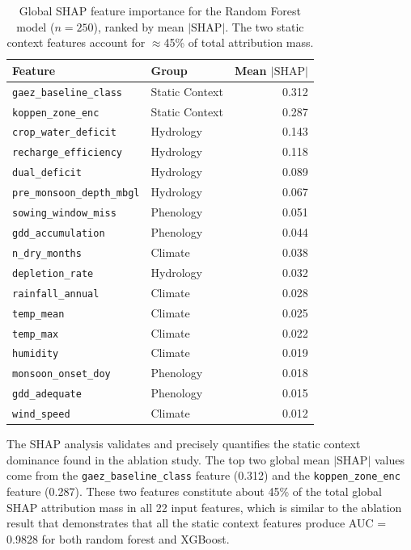 \documentclass{ieeeaccess}
\begin{document}
\begin{table}[t]
\centering
\caption{Global SHAP feature importance for the Random Forest model ($n=250$), ranked by mean $|\text{SHAP}|$. The two static context features account for $\approx$45\% of total attribution mass.}
\label{fig:shap_importance}
\begin{tabular}{llr}
\hline
\textbf{Feature} & \textbf{Group} & \textbf{Mean $|\text{SHAP}|$} \\
\hline
\texttt{gaez\_baseline\_class}      & Static Context & 0.312 \\
\texttt{koppen\_zone\_enc}          & Static Context & 0.287 \\
\texttt{crop\_water\_deficit}       & Hydrology      & 0.143 \\
\texttt{recharge\_efficiency}       & Hydrology      & 0.118 \\
\texttt{dual\_deficit}              & Hydrology      & 0.089 \\
\texttt{pre\_monsoon\_depth\_mbgl}  & Hydrology      & 0.067 \\
\texttt{sowing\_window\_miss}       & Phenology      & 0.051 \\
\texttt{gdd\_accumulation}          & Phenology      & 0.044 \\
\texttt{n\_dry\_months}             & Climate        & 0.038 \\
\texttt{depletion\_rate}            & Hydrology      & 0.032 \\
\texttt{rainfall\_annual}           & Climate        & 0.028 \\
\texttt{temp\_mean}                 & Climate        & 0.025 \\
\texttt{temp\_max}                  & Climate        & 0.022 \\
\texttt{humidity}                   & Climate        & 0.019 \\
\texttt{monsoon\_onset\_doy}        & Phenology      & 0.018 \\
\texttt{gdd\_adequate}              & Phenology      & 0.015 \\
\texttt{wind\_speed}                & Climate        & 0.012 \\
\hline
\end{tabular}
\end{table}

The SHAP analysis validates and precisely quantifies the static context dominance found in the ablation study. The top two global mean $|\text{SHAP}|$ values come from the \texttt{gaez\_baseline\_class} feature (0.312) and the \texttt{koppen\_zone\_enc} feature (0.287). These two features constitute about 45\% of the total global SHAP attribution mass in all 22 input features, which is similar to the ablation result that demonstrates that all the static context features produce AUC = 0.9828 for both random forest and XGBoost.
\end{document}
